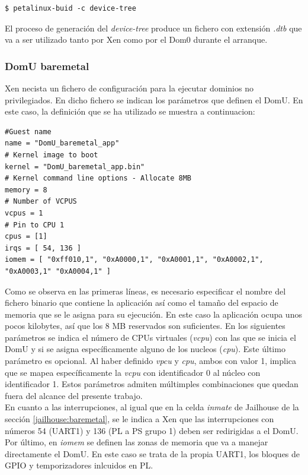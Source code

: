 \begin{lstlisting}[style=CStyle]
$ petalinux-buid -c device-tree
\end{lstlisting}

El proceso de generación del \textit{device-tree} produce un fichero con extensión \textit{.dtb} que va a ser utilizado tanto por Xen como por el Dom0 durante el arranque.

\subsubsection{DomU baremetal}

Xen necista un fichero de configuración para la ejecutar dominios no privilegiados. En dicho fichero se indican los parámetros que definen el DomU. En este caso, la definición que se ha utilizado se muestra a continuacion:

\begin{lstlisting}[style=CStyle]
#Guest name
name = "DomU_baremetal_app"
# Kernel image to boot
kernel = "DomU_baremetal_app.bin"
# Kernel command line options - Allocate 8MB
memory = 8
# Number of VCPUS
vcpus = 1
# Pin to CPU 1
cpus = [1]
irqs = [ 54, 136 ]
iomem = [ "0xff010,1", "0xA0000,1", "0xA0001,1", "0xA0002,1", "0xA0003,1" "0xA0004,1" ]
\end{lstlisting}

Como se observa en las primeras líneas, es necesario especificar el nombre del fichero binario que contiene la aplicación así como el tamaño del espacio de memoria que se le asigna para su ejecución. En este caso la aplicación ocupa unos pocos kilobytes, así que los 8 MB reservados son suficientes. En los siguientes parámetros se indica el número de CPUs virtuales (\textit{vcpu}) con las que se inicia el DomU y si se asigna específicamente alguno de los nucleos (\textit{cpu}). Este último parámetro es opcional. Al haber definido \textit{vpcu} y \textit{cpu}, ambos con valor 1, implica que se mapea específicamente la \textit{vcpu} con identificador 0 al núcleo con identificador 1. Estos parámetros admiten múltimples combinaciones que quedan fuera del alcance del presente trabajo.\\
En cuanto a las interrupciones, al igual que en la celda \textit{inmate} de Jailhouse de la sección \ref{jailhouse:baremetal}, se le indica a Xen que las interrupciones con números 54 (\acrshort{UART}1) y 136 (\acrshort{PL} a \acrshort{PS} grupo 1) deben ser redirigidas a el DomU.\\
Por último, en \textit{iomem} se definen las zonas de memoria que va a manejar directamente el DomU. En este caso se trata de la propia \acrshort{UART}1, los bloques de \acrshort{GPIO} y temporizadores inlcuidos en \acrshort{PL}.

